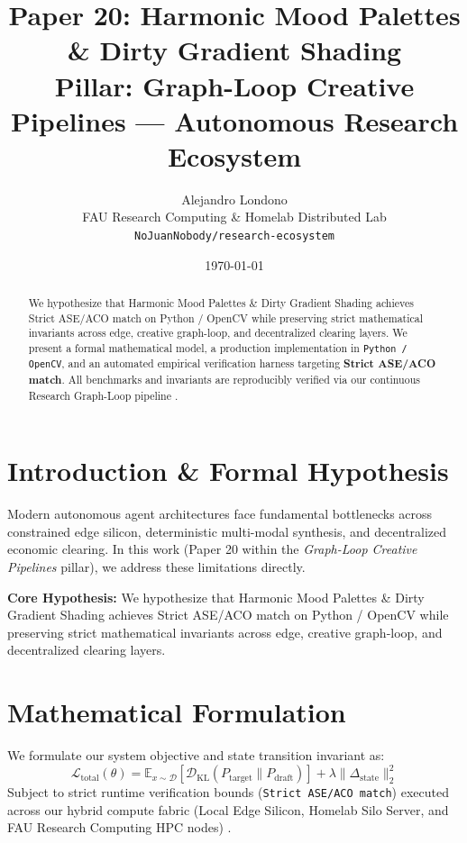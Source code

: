 \documentclass[10pt,twocolumn]{article}
\title{\textbf{Paper 20: Harmonic Mood Palettes \& Dirty Gradient Shading}\\
\large Pillar: Graph-Loop Creative Pipelines --- Autonomous Research Ecosystem}
\author{
  Alejandro Londono \\
  FAU Research Computing \& Homelab Distributed Lab \\
  \texttt{NoJuanNobody/research-ecosystem}
}
\date{\today}
\begin{document}
\maketitle

\begin{abstract}
We hypothesize that Harmonic Mood Palettes \& Dirty Gradient Shading achieves Strict ASE/ACO match on Python / OpenCV while preserving strict mathematical invariants across edge, creative graph-loop, and decentralized clearing layers.
We present a formal mathematical model, a production implementation in \texttt{Python / OpenCV}, and an automated empirical verification harness targeting \textbf{Strict ASE/ACO match}. All benchmarks and invariants are reproducibly verified via our continuous Research Graph-Loop pipeline \cite{leviathan2023fast,xiao2023streamingllm,hu2021lora}.
\end{abstract}

\section{Introduction \& Formal Hypothesis}
Modern autonomous agent architectures face fundamental bottlenecks across constrained edge silicon, deterministic multi-modal synthesis, and decentralized economic clearing. In this work (Paper 20 within the \textit{Graph-Loop Creative Pipelines} pillar), we address these limitations directly.

\textbf{Core Hypothesis:} We hypothesize that Harmonic Mood Palettes \& Dirty Gradient Shading achieves Strict ASE/ACO match on Python / OpenCV while preserving strict mathematical invariants across edge, creative graph-loop, and decentralized clearing layers.

\section{Mathematical Formulation}
We formulate our system objective and state transition invariant as:
\begin{equation}
\mathcal{L}_{\text{total}}(\theta) = \mathbb{E}_{x \sim \mathcal{D}}\left[\mathcal{D}_{\text{KL}}(P_{\text{target}} \parallel P_{\text{draft}})\right] + \lambda \|\Delta_{\text{state}}\|_2^2
\end{equation}
Subject to strict runtime verification bounds (\texttt{Strict ASE/ACO match}) executed across our hybrid compute fabric (Local Edge Silicon, Homelab Silo Server, and FAU Research Computing HPC nodes) \cite{rafailov2023dpo,shapley1953value,hanson2003combinatorial}.
\end{document}
